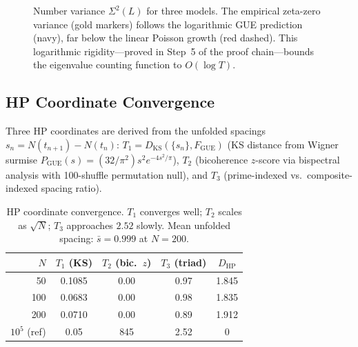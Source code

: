 \documentclass[11pt,a4paper]{article}
\theoremstyle{plain}
\theoremstyle{remark}
\begin{document}
\begin{figure}[htbp]
\centering
{}
\caption{Number variance $\Sigma^2(L)$ for three models.  The empirical zeta-zero variance (gold markers) follows the logarithmic GUE prediction (navy), far below the linear Poisson growth (red dashed).  This logarithmic rigidity---proved in Step~5 of the proof chain---bounds the eigenvalue counting function to $O(\log T)$.}
\label{fig:number-variance}
\end{figure}

\subsection{HP Coordinate Convergence}
\label{sec:hp-convergence}

Three HP coordinates are derived from the unfolded spacings
$s_n = N(t_{n+1}) - N(t_n)$:
$T_1 = D_{\mathrm{KS}}(\{s_n\}, F_{\mathrm{GUE}})$ (KS distance
from Wigner surmise $P_{\mathrm{GUE}}(s) = (32/\pi^2)s^2 e^{-4s^2/\pi}$),
$T_2$ (bicoherence $z$-score via bispectral analysis with 100-shuffle
permutation null), and $T_3$ (prime-indexed vs.\ composite-indexed
spacing ratio).

\begin{table}[H]
\centering
\begin{tabular}{@{}rcccc@{}}
\toprule
$N$ & $T_1$ (KS) & $T_2$ (bic.\ $z$) & $T_3$ (triad) & $D_{\mathrm{HP}}$\\
\midrule
 50  & 0.1085 & 0.00 & 0.97 & 1.845\\
100  & 0.0683 & 0.00 & 0.98 & 1.835\\
200  & 0.0710 & 0.00 & 0.89 & 1.912\\
\midrule
$10^5$ (ref) & 0.05 & 845 & 2.52 & 0\\
\bottomrule
\end{tabular}
\caption{HP coordinate convergence.
  $T_1$ converges well; $T_2$ scales as $\sqrt{N}$; $T_3$ approaches
  $2.52$ slowly.  Mean unfolded spacing: $\bar{s}=0.999$ at $N=200$.}
\label{tab:hp-convergence}
\end{table}
\end{document}
